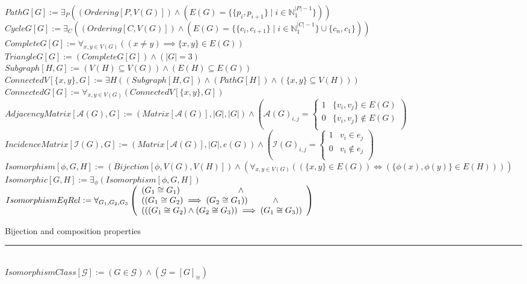 \documentclass{book}
\newcommand{\abr}{:=}
\newcommand{\pr}[1]{\left(#1\right)}
\newcommand{\st}{\mathbin{|}}
\newcommand{\utup}[1]{\{#1\}}
\begin{document}
$PathG[G] \abr \exists_{P}\pr{\pr{Ordering[P, V(G)]} \land \pr{E(G) = \{\utup{p_i, p_{i + 1}} \st i \in \mathbb{N}_1^{|P| - 1}\}}}$ \\
$CycleG[G] \abr \exists_{C}\pr{\pr{Ordering[C, V(G)]} \land \pr{E(G) = \{\utup{c_i, c_{i + 1}} \st i \in \mathbb{N}_1^{|C| - 1}\} \cup \{c_n, c_1\}}}$ \\
$CompleteG[G] \abr \forall_{x, y \in V(G)}\pr{(x \neq y) \implies \utup{x, y} \in E(G)}$ \\
$TriangleG[G] \abr (CompleteG[G]) \land (|G| = 3)$ \\

$Subgraph[H, G] \abr \pr{V(H) \subseteq V(G)} \land \pr{E(H) \subseteq E(G)}$ \\
$ConnectedV[\{x, y\}, G] \abr \exists{H}\pr{(Subgraph[H, G]) \land (PathG[H]) \land \pr{\{x, y\} \subseteq V(H)}}$ \\
$ConnectedG[G] \abr \forall_{x, y \in V(G)}(ConnectedV[\{x, y\}, G])$ \\

$AdjacencyMatrix[\mathcal{A}(G), G] \abr \pr{Matrix[\mathcal{A}(G)], |G|, |G|} \land \pr{\mathcal{A}(G)_{i, j} = 
\begin{cases} 
  1 & \utup{v_i, v_j} \in E(G) \\
  0 & \utup{v_i, v_j} \notin E(G) \\
\end{cases}}$ \\

$IncidenceMatrix[\mathcal{I}(G), G] \abr \pr{Matrix[\mathcal{A}(G)], |G|, e(G)} \land \pr{\mathcal{I}(G)_{i, j} = 
\begin{cases} 
  1 & v_i \in e_j \\
  0 & v_i \notin e_j \\
\end{cases}}$ \\

$Isomorphism[\phi, G, H] \abr \pr{Bijection[\phi, V(G), V(H)]} \land \pr{\forall_{x, y \in V(G)}\pr{\pr{\utup{x, y} \in E(G)} \iff \pr{\utup{\phi(x), \phi(y)} \in E(H)}}}$ \\
$Isomorphic[G, H] \abr \exists_{\phi}(Isomorphism[\phi, G, H])$ \\

$IsomorphismEqRel \abr \forall_{G_1, G_2, G_3}
\left(\begin{array}{ll}
  (G_1 \cong G_1) \hfill \land \hfill \\
  \pr{(G_1 \cong G_2) \implies (G_2 \cong G_1)} \hfill \land \hfill \\
  \pr{\pr{(G_1 \cong G_2) \land (G_2 \cong G_3)} \implies (G_1 \cong G_3)} \\
\end{array}\right)$
\begin{enumerate}
  \lit Bijection and composition properties
\end{enumerate} \vspace{.75mm} \hrule \vspace{.75mm} \ \\ 
$IsomorphismClass[\mathcal{G}] \abr (G \in \mathcal{G}) \land (\mathcal{G} = [G]_{\cong})$ \\
\end{document}
